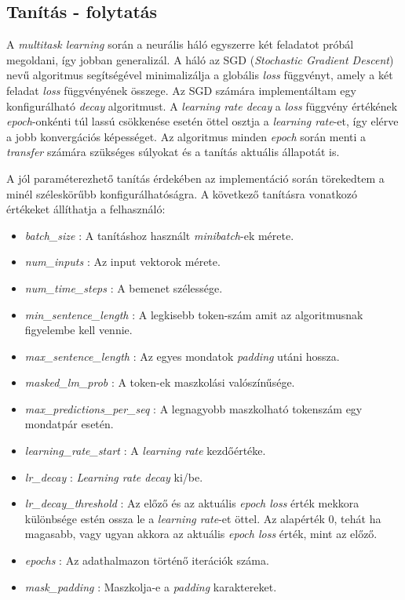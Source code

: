 \subsection*{Tanítás - folytatás}
A \textit{multitask learning} során a neurális háló egyszerre két feladatot próbál megoldani, így jobban generalizál. A háló az SGD (\textit{Stochastic Gradient Descent}) nevű algoritmus segítségével minimalizálja a globális \textit{loss} függvényt, amely a két feladat \textit{loss} függvényének összege.
Az SGD számára implementáltam egy konfigurálható \textit{decay} algoritmust. A \textit{learning rate decay} a \textit{loss} függvény értékének \textit{epoch}-onkénti túl lassú csökkenése esetén öttel osztja a \textit{learning rate}-et, így elérve a jobb konvergációs képességet. Az algoritmus minden \textit{epoch} során menti a \textit{transfer} számára szükséges súlyokat és a tanítás aktuális állapotát is.

A jól paraméterezhető tanítás érdekében az implementáció során törekedtem a minél széleskörűbb konfigurálhatóságra. A következő tanításra vonatkozó értékeket állíthatja a felhasználó:
\begin{itemize}
	\item \textit{batch\_size} : A tanításhoz használt \textit{minibatch}-ek mérete.
	\item \textit{num\_inputs} : Az input vektorok mérete.
	\item \textit{num\_time\_steps} : A bemenet szélessége.
	\item \textit{min\_sentence\_length} : A legkisebb token-szám amit az algoritmusnak figyelembe kell vennie.
	\item \textit{max\_sentence\_length} : Az egyes mondatok \textit{padding} utáni hossza.
	\item \textit{masked\_lm\_prob} : A token-ek maszkolási valószínűsége.
	\item \textit{max\_predictions\_per\_seq} : A legnagyobb maszkolható tokenszám egy mondatpár esetén.
	
	\item \textit{learning\_rate\_start} : A \textit{learning rate} kezdőértéke.
	\item \textit{lr\_decay} : \textit{Learning rate decay} ki/be.
	\item \textit{lr\_decay\_threshold} : Az előző és az aktuális \textit{epoch loss} érték mekkora különbsége estén ossza le a \textit{learning rate}-et öttel. Az alapérték 0, tehát ha magasabb, vagy ugyan akkora az aktuális \textit{epoch loss} érték, mint az előző.
	\item \textit{epochs} : Az adathalmazon történő iterációk száma.
	\item \textit{mask\_padding} : Maszkolja-e a \textit{padding} karaktereket.
\end{itemize}

